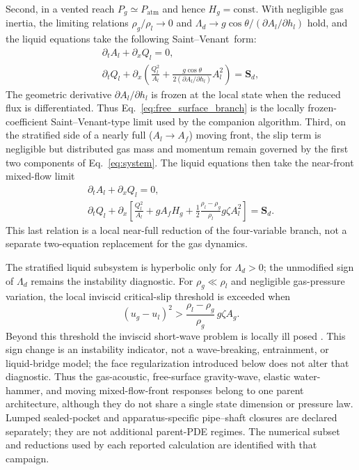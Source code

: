 Second, in a vented reach $P_g\simeq P_{\mathrm{atm}}$ and hence
$H_g=\mathrm{const.}$ With negligible gas inertia, the limiting relations
\mbox{$\rho_g/\rho_l\rightarrow0$} and
\mbox{$\Lambda_d\rightarrow g\cos\theta/(\partial A_l/\partial h_l)$} hold,
and the liquid equations
take the following \mbox{Saint--Venant form}:
\begin{equation}
\begin{gathered}
\partial_tA_l+\partial_xQ_l=0,\\[3pt]
\partial_tQ_l+
\partial_x\!\left(\frac{Q_l^2}{A_l}
+\frac{g\cos\theta}{2(\partial A_l/\partial h_l)}A_l^2\right)=\mathbf S_d,
\end{gathered}
\label{eq:free_surface_branch}
\end{equation}
The geometric derivative $\partial A_l/\partial h_l$ is frozen at the local
state when the reduced flux is differentiated. Thus
Eq.~\eqref{eq:free_surface_branch} is the locally frozen-coefficient
Saint--Venant-type limit used by the companion algorithm.
Third, on the stratified side of a nearly full
($A_l\rightarrow A_f$) moving front, the slip term is negligible but
distributed gas mass and momentum remain governed by the first two components
of Eq.~\eqref{eq:system}. The liquid equations then take the near-front
mixed-flow limit
\begin{equation}
\begin{gathered}
\partial_tA_l+\partial_xQ_l=0,\\[3pt]
\partial_tQ_l+
\partial_x\!\left[
\frac{Q_l^2}{A_l}+gA_fH_g
+\frac12\frac{\rho_l-\rho_g}{\rho_l}g\zeta A_l^2
\right]=\mathbf S_d.
\end{gathered}
\label{eq:near_front_branch}
\end{equation}
This last relation is a local near-full reduction of the four-variable branch,
not a separate two-equation replacement for the gas dynamics.

The stratified liquid subsystem is hyperbolic only for $\Lambda_d>0$; the
unmodified sign of $\Lambda_d$ remains the instability diagnostic. For
$\rho_g\ll\rho_l$ and negligible gas-pressure variation, the local inviscid
critical-slip threshold is exceeded when
\begin{equation}
(u_g-u_l)^2>
\frac{\rho_l-\rho_g}{\rho_g}\,g\zeta A_g.
\label{eq:critical_slip}
\end{equation}
Beyond this threshold the inviscid short-wave problem is locally ill posed
\cite{stuhmiller1977}. This sign change is an instability indicator, not a
wave-breaking, entrainment, or liquid-bridge model; the face regularization
introduced below does not alter that diagnostic. Thus the gas-acoustic,
free-surface gravity-wave, elastic water-hammer, and moving mixed-flow-front
responses belong to one parent architecture, although they do not share a
single state dimension or pressure law. Lumped sealed-pocket and
apparatus-specific pipe--shaft closures are declared separately; they are not
additional parent-PDE regimes. The numerical subset and reductions used by each
reported calculation are identified with that campaign.

